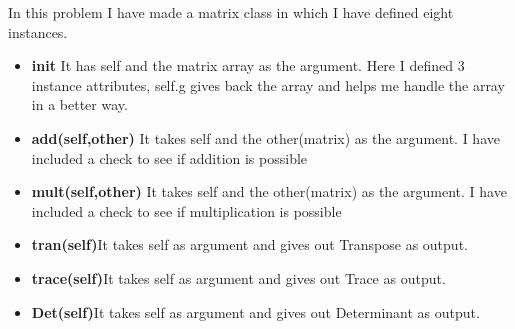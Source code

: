 \documentclass{article}
\begin{document}
In this problem I have made a matrix class in which I have defined eight instances. \vspace{0.2em}

\begin{itemize}

\item{\textbf{init}}\vspace{0.2em} It has self and the matrix array as the argument. Here I defined 3 instance attributes, self.g gives back the array and helps me handle the array in a better way.
\item{\textbf{add(self,other)}}\vspace{0.2em} It takes self and the other(matrix) as the argument. I have included a check to see if addition is possible
\item{\textbf{mult(self,other)}}\vspace{0.2em} It takes self and the other(matrix) as the argument. I have included a check to see if multiplication is possible
\item{\textbf{tran(self)}}\vspace{0.2em}It takes self as argument and gives out Transpose as output.
\item{\textbf{trace(self)}}\vspace{0.2em}It takes self as argument and gives out Trace as output.
\item{\textbf{Det(self)}}\vspace{0.2em}It takes self as argument and gives out Determinant as output.


\end{itemize}
\end{document}
